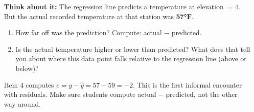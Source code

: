 \documentclass[10pt]{article}
\begin{document}
\vspace{0.12in}

\begin{tcolorbox}[colback=greenbg, colframe=greenacc, boxrule=0.8pt, arc=2mm,
    left=4mm, right=4mm, top=3mm, bottom=3mm]
    \small
    \textbf{Think about it:} The regression line predicts a temperature at elevation $= 4$.
    But the actual recorded temperature at that station was \textbf{57°F}.
\end{tcolorbox}

\vspace{0.14in}

\begin{enumerate}[leftmargin=1.6em, itemsep=0.22in, start=4]

  \item How far off was the prediction? Compute: actual $-$ predicted.\\[8pt]

  \item Is the actual temperature higher or lower than predicted? What does that tell you
        about where this data point falls relative to the regression line (above or below)?\\[8pt]

\end{enumerate}

\begin{teachernote}
Item 4 computes $e = y - \hat{y} = 57 - 59 = -2$. This is the first informal encounter with
residuals. Make sure students compute actual $-$ predicted, not the other way around.
\end{teachernote}
\end{document}
